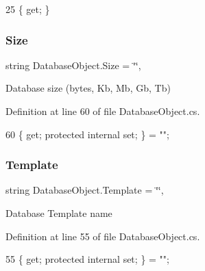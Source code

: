 \begin{DoxyCode}
25 \{ \textcolor{keyword}{get}; \}
\end{DoxyCode}
\mbox{\label{class_database_object_ad86f5dd95a9debdef284e21e32936e9e}} 
\subsubsection{\texorpdfstring{Size}{Size}}
{\footnotesize\ttfamily string Database\+Object.\+Size = \char`\"{}\char`\"{}\hspace{0.3cm}{\ttfamily [get]}, {\ttfamily [set]}}



Database size (bytes, Kb, Mb, Gb, Tb) 



Definition at line 60 of file Database\+Object.\+cs.


\begin{DoxyCode}
60 \{ \textcolor{keyword}{get}; \textcolor{keyword}{protected} \textcolor{keyword}{internal} \textcolor{keyword}{set}; \} = \textcolor{stringliteral}{""};
\end{DoxyCode}
\mbox{\label{class_database_object_ac8ecdbe9722c00f787a62aef7d3dfa5a}} 
\subsubsection{\texorpdfstring{Template}{Template}}
{\footnotesize\ttfamily string Database\+Object.\+Template = \char`\"{}\char`\"{}\hspace{0.3cm}{\ttfamily [get]}, {\ttfamily [set]}}



Database Template name 



Definition at line 55 of file Database\+Object.\+cs.


\begin{DoxyCode}
55 \{ \textcolor{keyword}{get}; \textcolor{keyword}{protected} \textcolor{keyword}{internal} \textcolor{keyword}{set}; \} = \textcolor{stringliteral}{""};
\end{DoxyCode}
\mbox{\label{class_database_object_a9af3f75274dd39f7fa82a355dc4ddf39}} 
